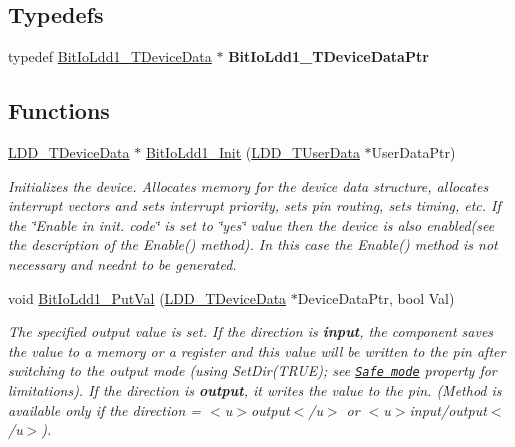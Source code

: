 \subsection*{Typedefs}
\begin{DoxyCompactItemize}
\item 
\mbox{\label{group___bit_io_ldd1__module_ga340fc98ffd5cf9615926496b47eaa19a}} 
typedef \hyperlink{struct_bit_io_ldd1___t_device_data}{Bit\+Io\+Ldd1\+\_\+\+T\+Device\+Data} $\ast$ {\bfseries Bit\+Io\+Ldd1\+\_\+\+T\+Device\+Data\+Ptr}
\end{DoxyCompactItemize}
\subsection*{Functions}
\begin{DoxyCompactItemize}
\item 
\hyperlink{group___p_e___types__module_gac5cf1362f1f0e3a2ce71b1bf2276d091}{L\+D\+D\+\_\+\+T\+Device\+Data} $\ast$ \hyperlink{group___bit_io_ldd1__module_gadb85449174dc263f061e143166eb86c5}{Bit\+Io\+Ldd1\+\_\+\+Init} (\hyperlink{group___p_e___types__module_ga0b66a73f87238a782318aa0be7578e35}{L\+D\+D\+\_\+\+T\+User\+Data} $\ast$User\+Data\+Ptr)
\begin{DoxyCompactList}\small\item\em Initializes the device. Allocates memory for the device data structure, allocates interrupt vectors and sets interrupt priority, sets pin routing, sets timing, etc. If the \char`\"{}\+Enable
    in init. code\char`\"{} is set to \char`\"{}yes\char`\"{} value then the device is also enabled(see the description of the Enable() method). In this case the Enable() method is not necessary and needn\textquotesingle{}t to be generated. \end{DoxyCompactList}\item 
void \hyperlink{group___bit_io_ldd1__module_ga753b1b610d7f46784d5e5ec7ca43d6cd}{Bit\+Io\+Ldd1\+\_\+\+Put\+Val} (\hyperlink{group___p_e___types__module_gac5cf1362f1f0e3a2ce71b1bf2276d091}{L\+D\+D\+\_\+\+T\+Device\+Data} $\ast$Device\+Data\+Ptr, bool Val)
\begin{DoxyCompactList}\small\item\em The specified output value is set. If the direction is {\bfseries  input}, the component saves the value to a memory or a register and this value will be written to the pin after switching to the output mode (using {\ttfamily Set\+Dir(\+T\+R\+U\+E)}; see \href{BitIOProperties.html#SafeMode}{\tt Safe mode} property for limitations). If the direction is {\bfseries output}, it writes the value to the pin. (Method is available only if the direction = $<$u$>${\ttfamily output}$<$/u$>$ or $<$u$>${\ttfamily  input/output}$<$/u$>$). \end{DoxyCompactList}\end{DoxyCompactItemize}


